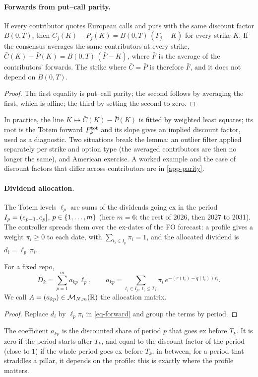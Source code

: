 \paragraph{Forwards from put--call parity.}
\begin{lemma}\label{lem-parity}
If every contributor quotes European calls and puts with the same discount factor $B(0, T)$, then
$C_j(K)-P_j(K)=B(0, T)\,(F_j-K)$ for every strike $K$. If the consensus averages the same contributors at every
strike, $\bar C(K)-\bar P(K)=B(0, T)\,(\bar F-K)$, where $\bar F$ is the average of the contributors' forwards. The
strike where $\bar C=\bar P$ is therefore $\bar F$, and it does not depend on $B(0, T)$.
\end{lemma}
\begin{proof}
The first equality is put--call parity; the second follows by averaging the first, which is affine; the third by
setting the second to zero.
\end{proof}
In practice, the line $K\mapsto\bar C(K)-\bar P(K)$ is fitted by weighted least squares; its root is the Totem forward
$F^{\mathrm{tot}}_k$ and its slope gives an implied discount factor, used as a diagnostic. Two situations break the lemma: an
outlier filter applied separately per strike and option type (the averaged contributors are then no longer the same),
and American exercise. A worked example and the case of discount factors that differ across contributors are in
\cref{app-parity}.

\paragraph{Dividend allocation.} The Totem levels $\ell_p$ are sums of the dividends going ex in the period
$I_p=\mathopen{(}e_{p-1}, e_p\mathclose{]}$, $p\in\{1,\dots,m\}$ (here $m=6$: the rest of 2026, then 2027 to 2031). The controller spreads them
over the ex-dates of the FO forecast: a profile gives a weight $\pi_i\ge0$ to each date, with
$\sum_{t_i\in I_p}\pi_i=1$, and the allocated dividend is $d_i=\ell_p\,\pi_i$.

\begin{lemma}[Allocation]\label{lem-allocation}
For a fixed repo,
\[
D_k=\sum_{p=1}^m a_{kp}\,\ell_p, \qquad a_{kp}=\sum_{t_i\in I_p,\ t_i\le T_k}\pi_i\,e^{-(r(t_i)-q(t_i))\,t_i} .
\]
We call $A=(a_{kp})\in\mathcal{M}_{N,m}(\mathbb{R})$ the allocation matrix.
\end{lemma}
\begin{proof}
Replace $d_i$ by $\ell_p\pi_i$ in \eqref{eq-forward} and group the terms by period.
\end{proof}
The coefficient $a_{kp}$ is the discounted share of period $p$ that goes ex before $T_k$. It is zero if the period
starts after $T_k$, and equal to the discount factor of the period (close to $1$) if the whole period goes ex before
$T_k$; in between, for a period that straddles a pillar, it depends on the profile: this is exactly where the profile
matters.

